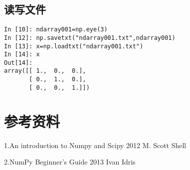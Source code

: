 \documentclass[12pt,oneside]{book}
\begin{document}
\begin{common-format}
\begin{Verbatim}
\end{Verbatim}


\section{读写文件}
\begin{Verbatim}
In [10]: ndarray001=np.eye(3)
In [12]: np.savetxt("ndarray001.txt",ndarray001)
In [13]: x=np.loadtxt("ndarray001.txt")
In [14]: x
Out[14]: 
array([[ 1.,  0.,  0.],
       [ 0.,  1.,  0.],
       [ 0.,  0.,  1.]])
\end{Verbatim}




\chapter{参考资料}
1.An introduction to Numpy and Scipy  2012 M. Scott Shell

2.NumPy Beginner's Guide 2013 Ivan Idris


\end{common-format}
\end{document}
